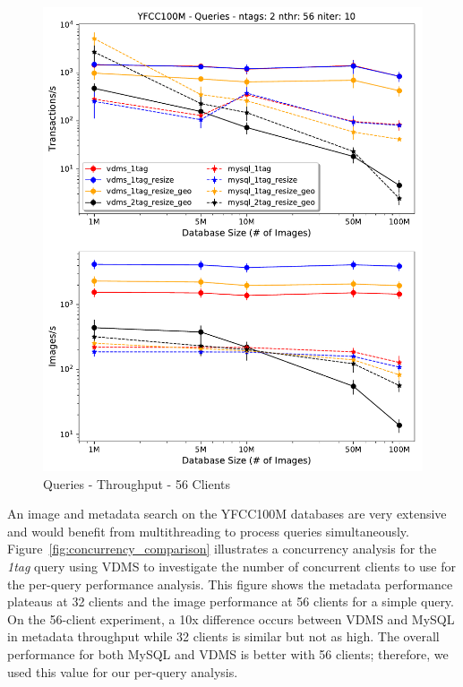 \begin{figure}[t!]
\centering
\includegraphics[width=\columnwidth]{figures/queries_throughput_56}
\caption{Queries - Throughput - 56 Clients}
\label{fig:q_throughput_56}
\end{figure}

An image and metadata search on the YFCC100M databases are very extensive
and would benefit from multithreading to process queries simultaneously.
Figure~\ref{fig:concurrency_comparison} illustrates a concurrency analysis for
the \textit{1tag} query using VDMS to investigate the number of
concurrent clients to use for the per-query performance analysis.
This figure shows the metadata performance plateaus at 32 clients and
the image performance at 56 clients for a simple query.
On the 56-client experiment, a 10x difference occurs between VDMS and
MySQL in metadata throughput while 32 clients is similar but not as high.
The overall performance for both MySQL and VDMS is better with 56 clients;
therefore, we used this value for our per-query analysis.

